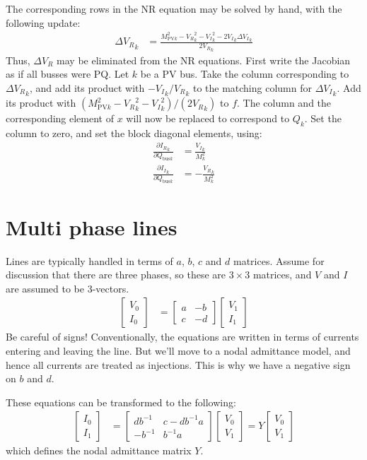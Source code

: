 \documentclass[11pt]{article}
\newcommand{\re}[1]{{{#1}_R}}
\newcommand{\im}[1]{{{#1}_I}}
\begin{document}
The corresponding rows in the NR equation may be solved by hand, with the following update:
\begin{align}
\re{\Delta V}_k &= \frac{M^2_{\text{PV}k} - \re{V}_k^2 - \im{V}_k^2- 2\im{V}_k\im{\Delta V}_k}{2\re{V}_k}
\end{align}
Thus, $\re{\Delta V}$ may be eliminated from the NR equations.  First write the Jacobian as if all busses were PQ. Let $k$ be a PV bus. Take the column corresponding to $\re{\Delta V}_k$, and add its product with $-\im{V}_k/\re{V}_k$ to the matching column for  $\im{\Delta V}_k$. Add its product with $(M^2_{\text{PV}k} - \re{V}_k^2 - \im{V}_k^2)/(2\re{V}_k)$ to $f$. The column and the corresponding element of $x$ will now be replaced to correspond to $Q_k$. Set the column to zero, and set the block diagonal elements, using:
\begin{align}
\frac{\partial \re{I}_k}{\partial Q_{\text{bus}k}} &= \frac{\im{V}_k}{M_k^2} \\
\frac{\partial \im{I}_k}{\partial Q_{\text{bus}k}} &= -\frac{\re{V}_k}{M_k^2}
\end{align}
\section{Multi phase lines}
Lines are typically handled in terms of $a$, $b$, $c$ and $d$ matrices. Assume for discussion that there are three phases, so these are $3 \times 3$ matrices, and $V$ and $I$ are assumed to be 3-vectors.
\begin{align}
	\begin{bmatrix} V_0 \\ I_0 \end{bmatrix} &=
	\begin{bmatrix} a & -b \\ c & -d \end{bmatrix} \begin{bmatrix} V_1 \\ I_1 \end{bmatrix}
\end{align}
Be careful of signs! Conventionally, the equations are written in terms of currents entering and leaving the line. But we'll move to a nodal admittance model, and hence all currents are treated as injections. This is why we have a negative sign on $b$ and $d$.

These equations can be transformed to the following:
\begin{align}
	\begin{bmatrix} I_0 \\ I_1 \end{bmatrix} &=
	\begin{bmatrix} db^{-1} & c - db^{-1}a \\ -b^{-1} & b^{-1}a \end{bmatrix} \begin{bmatrix} V_0 \\ V_1 \end{bmatrix} = Y\begin{bmatrix} V_0 \\ V_1 \end{bmatrix} 
\end{align}
which defines the nodal admittance matrix $Y$.
\end{document}
